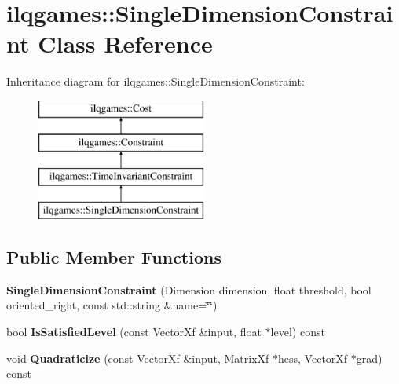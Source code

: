 \hypertarget{classilqgames_1_1_single_dimension_constraint}{}\section{ilqgames\+:\+:Single\+Dimension\+Constraint Class Reference}
\label{classilqgames_1_1_single_dimension_constraint}
Inheritance diagram for ilqgames\+:\+:Single\+Dimension\+Constraint\+:\begin{figure}[H]
\begin{center}
\leavevmode
\includegraphics[height=4.000000cm]{classilqgames_1_1_single_dimension_constraint}
\end{center}
\end{figure}
\subsection*{Public Member Functions}
\begin{DoxyCompactItemize}
\item 
{\bfseries Single\+Dimension\+Constraint} (Dimension dimension, float threshold, bool oriented\+\_\+right, const std\+::string \&name=\char`\"{}\char`\"{})\hypertarget{classilqgames_1_1_single_dimension_constraint_ac9f91e5938602c15b23b48756866b84e}{}\label{classilqgames_1_1_single_dimension_constraint_ac9f91e5938602c15b23b48756866b84e}

\item 
bool {\bfseries Is\+Satisfied\+Level} (const Vector\+Xf \&input, float $\ast$level) const \hypertarget{classilqgames_1_1_single_dimension_constraint_a84f2eb8c9c3e8a8b4a49ce998a189808}{}\label{classilqgames_1_1_single_dimension_constraint_a84f2eb8c9c3e8a8b4a49ce998a189808}

\item 
void {\bfseries Quadraticize} (const Vector\+Xf \&input, Matrix\+Xf $\ast$hess, Vector\+Xf $\ast$grad) const \hypertarget{classilqgames_1_1_single_dimension_constraint_a4079f6f9af8858c0520d60133a5ef3fb}{}\label{classilqgames_1_1_single_dimension_constraint_a4079f6f9af8858c0520d60133a5ef3fb}

\end{DoxyCompactItemize}
